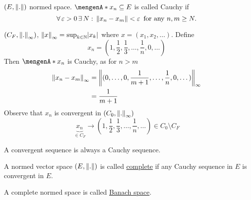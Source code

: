 \begin{definition*}
	$(E, \norm{.})$ normed space. $\set{x_n} \subseteq E$ is called Cauchy if
	\[
		\forall\, \varepsilon >0 \,\exists\,N: \,\norm{x_n-x_m}< \varepsilon \,\text{ for any }n,m \geq N.
	\]
\end{definition*}
\begin{beispiel}
	$(C_F,\norm{.}_{\infty})$, $\norm{x}_{\infty}= \sup_{k \in \mathbb{N}}\abs{x_k}$ where $x = (x_1,x_2,\dots)$. Define
	\[
		x_n = (1, \frac{1}{2}, \frac{1}{3}, \dots, \frac{1}{n}, 0, \dots)
	\]
	Then $\set{x_n}$ is Cauchy, as for $n >m$ 
	\begin{align*}
		\norm{x_n-x_m}_{\infty} &= \norm{(0, \dots,0, \frac{1}{m+1}, \dots, \frac{1}{n},0,\dots)}_{\infty} \\
		&= \frac{1}{m+1}
	\end{align*}
	Observe that $x_n$ is convergent in $(C_0,\norm{.}_{\infty})$
	\[
		\underset{\in C_F}{\underbrace{x_n}} \to (1, \frac{1}{2}, \frac{1}{3}, \dots, \frac{1}{n}, \dots) \in C_0 \setminus C_F
	\]
\end{beispiel}
\begin{satz}
	A convergent sequence is always a Cauchy sequence.
\end{satz}
\begin{definition*}
	A normed vector space $(E, \norm{.})$ is called \underline{complete} if any Cauchy sequence in $E$ is convergent in $E$.
\end{definition*}
\begin{definition*}
	A complete normed space is called \underline{Banach space}.
\end{definition*}

